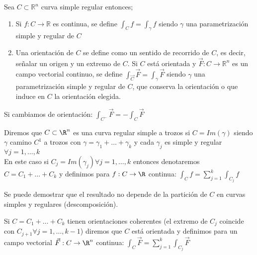 \begin{definición}
Sea $C \subset \mathbb{R}^n$ curva simple regular entonces;
\begin{enumerate}
    \item Si $f: C \to \mathbb{R}$ es continua, se define $\int_{C} f = \int_{\gamma} f$
          siendo $\gamma$ una parametrización simple y regular de $C$
    \item Una orientación de $C$ se define como un sentido de recorrido de $C$, es decir,
          señalar un origen y un extremo de $C$. Si $C$ está orientada y $\vec{F}: C \to
              \mathbb{R}^n$ es un campo vectorial continuo, se define $\int_{\vec{C}} \vec{F}
              = \int_{\gamma} \vec{F}$ siendo $\gamma$ una parametrización simple y regular
          de $C$, que conserva la orientación o que induce en $C$ la orientación elegida. \end{enumerate}
\end{definición}

\begin{observación}
Si cambiamos de orientación: $\int_{C^-} \vec{F} = -\int_{C} \vec{F}$
\end{observación}

\begin{definición}
Diremos que $C \subset \R^n $ es una curva regular simple a trozos si $C = Im(\gamma)$ siendo $\gamma$ camino $C^1$ a trozos con $\gamma = \gamma_1 + \ldots + \gamma_k$ y cada $\gamma_j$ es simple y regular $\forall j = 1, \ldots, k$\\
En este caso si $C_j = Im(\gamma_j) \forall j = 1, \ldots, k$ entonces denotaremos $C = C_1 + \ldots + C_k$ y definimos para $f: C \to \R$ continua: $\int_{C} f = \sum_{j=1}^{k} \int_{C_j} f$
\end{definición}

\begin{observación}
Se puede demostrar que el resultado no depende de la partición de $C$ en curvas simples y regulares (descomposición).
\end{observación}

\begin{observación}
Si $C = C_1 + \ldots + C_k$ tienen orientaciones coherentes (el extremo de $C_j$ coincide con $C_{j+1} \forall j = 1, \ldots, k-1$) diremos que $C$ está orientada y definimos para un campo vectorial $\vec{F}: C \to \R^n$ continua: $\int_{C} \vec{F} = \sum_{j=1}^{k} \int_{C_j} \vec{F}$
\end{observación}

